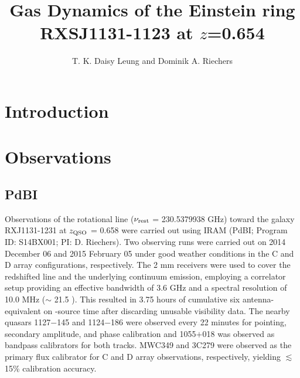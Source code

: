 \documentclass[]{emulateapj}
\begin{document}

\title{Gas Dynamics of the Einstein ring RXSJ1131-1123 at $z$=0.654}
\author{T. K. Daisy Leung and Dominik A. Riechers}

\begin{abstract}
\end{abstract}


\section{Introduction}

\section{Observations}
\subsection{PdBI \bco} %
Observations of the \bco rotational line ($\nu_{\rm rest}$ = 230.5379938 GHz)
toward the \gl galaxy RXJ1131-1231 at $z_{\rm QSO}$ =
0.658 were carried out using IRAM \pdbi (PdBI; Program ID: S14BX001; PI: D.
Riechers). Two observing runs were carried out on 2014 December 06 and 2015
February 05 under good weather conditions in the C and D array configurations,
respectively. The 2 mm receivers were used to cover the redshifted \bco line
and the underlying continuum emission, employing a correlator setup providing
an effective bandwidth of 3.6 GHz and a spectral resolution of 10.0 MHz ($\sim$
21.5 \kms). This resulted in 3.75 hours of cumulative six antenna-equivalent on
-source time after discarding unusable visibility data.
The nearby quasars 1127$-$145 and 1124$-$186 were observed every 22 minutes
for pointing, secondary amplitude, and phase calibration and 1055$+$018 was
observed as bandpass calibrators for both tracks.
MWC349 and 3C279 were observed as the primary flux calibrator for C and D
array observations, respectively, yielding $\lesssim$15\% calibration accuracy.
\end{document}
